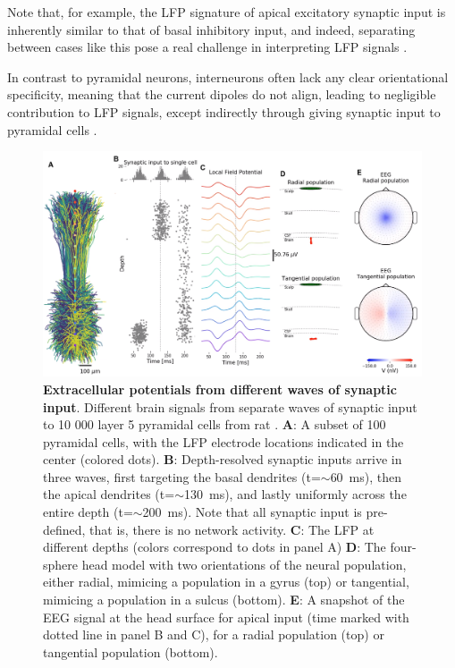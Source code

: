 \documentclass[preprint,11pt,authoryear]{elsarticle}
\begin{document}
Note that, for example, the LFP signature of apical excitatory synaptic input is inherently similar to that of basal inhibitory input, and indeed, separating between cases like this pose a real challenge in interpreting LFP signals \citep{Linden2010}. 

In contrast to pyramidal neurons, interneurons often lack any clear orientational specificity, meaning that the current dipoles do not align, leading to negligible contribution to LFP signals, except indirectly through giving synaptic input to pyramidal cells \citep{Hagen2016, Telenczuk2016}.

\begin{figure}[!ht]
\begin{center}
\includegraphics[width=1\textwidth]{population_EEG_MEG.png}
\end{center}
\caption{\textbf{Extracellular potentials from different waves of synaptic input}. Different brain signals from separate waves of synaptic input to 10 000 layer 5 pyramidal cells from rat \citep{Hay2011}.
{\bf A}: A subset of 100 pyramidal cells, with the LFP electrode locations indicated in the center (colored dots).
{\bf B}: Depth-resolved synaptic inputs arrive in three waves, first targeting the basal dendrites (t=$\sim$60~ms), then the apical dendrites (t=$\sim$130~ms), and lastly uniformly across the entire depth (t=$\sim$200~ms). Note that all synaptic input is pre-defined, that is, there is no network activity.
{\bf C}: The LFP at different depths (colors correspond to dots in panel A)
{\bf D}: The four-sphere head model with two orientations of the neural population, either radial, mimicing a population in a gyrus (top) or tangential, mimicing a population in a sulcus (bottom).
{\bf E}: A snapshot of the EEG signal at the head surface for apical input (time marked with dotted line in panel B and C), for a radial population (top) or tangential population (bottom).
}
\label{fig:LFP_EEG}
\end{figure}
\end{document}
